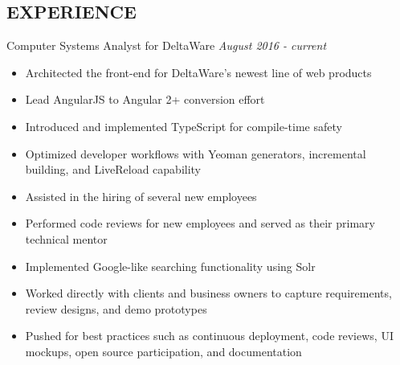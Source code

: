 \documentclass{nfriend-resume}
\begin{document}
\begin{resume}
\section{EXPERIENCE}
Computer Systems Analyst for DeltaWare \hfill \textit{\color{gray}August 2016 - current}\\
\begin{itemize}
    \item{Architected the front-end for DeltaWare’s newest line of web products}
    \item{Lead AngularJS to Angular 2+ conversion effort}
    \item{Introduced and implemented TypeScript for compile-time safety}
    \item{Optimized developer workflows with Yeoman generators, incremental building, and LiveReload capability}
    \item{Assisted in the hiring of several new employees}
    \item{Performed code reviews for new employees and served as their primary technical mentor}
    \item{Implemented Google-like searching functionality using Solr}
    \item{Worked directly with clients and business owners to capture requirements, review designs, and demo prototypes}
    \item{Pushed for best practices such as continuous deployment, code reviews, UI mockups, open source participation, and documentation}
\end{itemize}

\end{resume}
\end{document}
